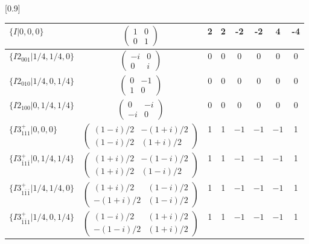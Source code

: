 \documentclass[3p,preprint]{elsarticle}
\begin{document}
\begin{table}[H]
	\scalebox{0.9}[0.9]{
		\begin{tabular}{|l|c||c|c|c|c|c|c|} \hline									
			$\{I|0,0,0\}$ & 				$\left(\begin{array}{cc} 1&0 \\ 0&1 \end{array}\right)$	& 2 &  2 &  -2 &  -2 &  4 &  -4 \\ \hline
			$\{I2_{001}|1/4,1/4,0\}$ &		$\left(\begin{array}{cc} -i&0 \\ 0&i \end{array}\right)$	& 0 & $0$ & 0 & $0$ & 0 & 0 \\ \hline
			$\{I2_{010}|1/4,0,1/4\}$ &		$\left(\begin{array}{cc} 0&-1 \\ 1&0 \end{array}\right)$	&0 & $0$ & 0 & $0$ & 0 & 0 \\ \hline
			$\{I2_{100}|0,1/4,1/4\}$ &		$\left(\begin{array}{cc} 0&-i \\ -i&0 \end{array}\right)$	& 0 & $0$ & 0 & $0$ & 0 & 0 \\ \hline
			$\{I3^{+}_{111}|0,0,0\}$ &		$\left(\begin{array}{cc} (1-i)/2&-(1+i)/2 \\ (1-i)/2&(1+i)/2 \end{array}\right)$	&1 & 1 & $-1$ & $-1$ & $-1$ & 1 \\ \hline
			$\{I3^{+}_{\bar{1}1\bar{1}}|0,1/4,1/4\}$ &		$\left(\begin{array}{cc} (1+i)/2&-(1-i)/2 \\ (1+i)/2&(1-i)/2 \end{array}\right)$	&1 & 1 & $-1$ & $-1$ & $-1$ & 1 \\ \hline
			$\{I3^{+}_{1\bar{1}\bar{1}}|1/4,1/4,0\}$ &		$\left(\begin{array}{cc} (1+i)/2&(1-i)/2 \\ -(1+i)/2&(1-i)/2 \end{array}\right)$	& 1 & 1 & $-1$ & $-1$ & $-1$ & 1 \\ \hline
			$\{I3^{+}_{\bar{1}\bar{1}1}|1/4,0,1/4\}$ &		$\left(\begin{array}{cc} (1-i)/2&(1+i)/2 \\ -(1-i)/2&(1+i)/2 \end{array}\right)$	&1 & 1 & $-1$ & $-1$ & $-1$ & 1 \\ \hline

\end{tabular}}
\end{table}
\end{document}
